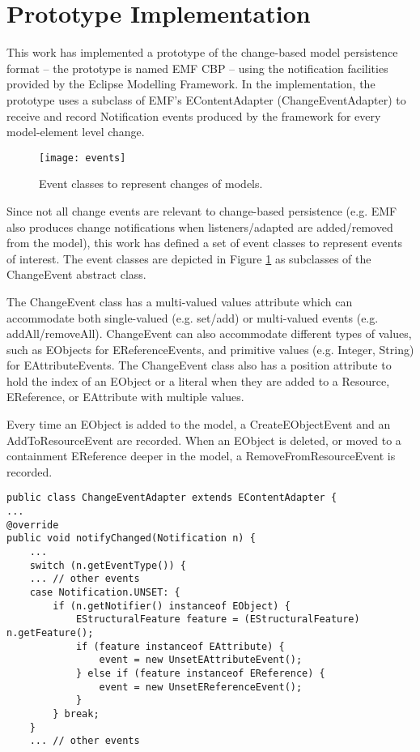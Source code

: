 \section{Prototype Implementation}
\label{sec:prototype_implementation}
This work has implemented a prototype \cite{epsilonlabs2019emfcbp} of the change-based model persistence format -- the prototype is named EMF CBP -- using the notification facilities provided by the Eclipse Modelling Framework. In the implementation, the prototype uses a subclass of EMF's \textsf{EContentAdapter} (\textsf{ChangeEventAdapter}) to receive and record \textsf{Notification} events produced by the framework for every model-element level change.

\begin{figure}[th]
    \centering
    \texttt{[image: events]}
    \caption{Event classes to represent changes of models.}
    \label{fig:events}
\end{figure}

Since not all change events are relevant to change-based persistence (e.g. EMF also produces change notifications when listeners/adapted are added/removed from the model), this work has defined a set of event classes to represent events of interest. The event classes are depicted in Figure \ref{fig:events} as subclasses of the \textsf{ChangeEvent} abstract class.

The \textsf{ChangeEvent} class has a multi-valued \textsf{values} attribute which can accommodate both single-valued (e.g. set/add) or multi-valued events (e.g. addAll/removeAll). \textsf{ChangeEvent} can also accommodate different types of values, such as \textsf{EObject}s for \textsf{EReferenceEvents}, and primitive values (e.g. Integer, String) for \textsf{EAttributeEvents}. The \textsf{ChangeEvent} class also has a position attribute to hold the  index of an \textsf{EObject} or a literal when they are added to a \textsf{Resource}, \textsf{EReference}, or \textsf{EAttribute} with multiple values. 

Every time an \textsf{EObject} is added to the model, a \textsf{CreateEObjectEvent} and an \textsf{AddToResourceEvent} are recorded. When an EObject is deleted, or moved to a containment \textsf{EReference} deeper in the model, a \textsf{RemoveFromResourceEvent}
 is recorded.

\vspace{-20pt}
\begin{lstlisting}[style=java,caption={Simplified Java code to handle notification events.},label=lst:javacode]
public class ChangeEventAdapter extends EContentAdapter {
...
@override
public void notifyChanged(Notification n) {
    ...
    switch (n.getEventType()) {
    ... // other events
    case Notification.UNSET: {
        if (n.getNotifier() instanceof EObject) {
            EStructuralFeature feature = (EStructuralFeature) n.getFeature();
            if (feature instanceof EAttribute) {
                event = new UnsetEAttributeEvent();
            } else if (feature instanceof EReference) {
                event = new UnsetEReferenceEvent();
            }
        } break;
    } 
    ... // other events
\end{lstlisting}	

